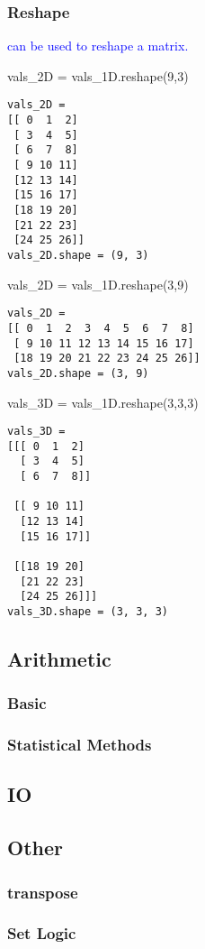 \subsubsection{Reshape}

\textcolor{blue}{ can be used to reshape a matrix.}

\begin{python}
vals_2D = vals_1D.reshape(9,3)
\end{python}
\begin{lstlisting}[style=pyOutStyle]
vals_2D = 
[[ 0  1  2]
 [ 3  4  5]
 [ 6  7  8]
 [ 9 10 11]
 [12 13 14]
 [15 16 17]
 [18 19 20]
 [21 22 23]
 [24 25 26]]
vals_2D.shape = (9, 3)
\end{lstlisting}



\begin{python}
vals_2D = vals_1D.reshape(3,9)
\end{python}
\begin{lstlisting}[style=pyOutStyle]
vals_2D = 
[[ 0  1  2  3  4  5  6  7  8]
 [ 9 10 11 12 13 14 15 16 17]
 [18 19 20 21 22 23 24 25 26]]
vals_2D.shape = (3, 9)
\end{lstlisting}



\begin{python}
vals_3D = vals_1D.reshape(3,3,3)
\end{python}
\begin{lstlisting}[style=pyOutStyle]
vals_3D = 
[[[ 0  1  2]
  [ 3  4  5]
  [ 6  7  8]]

 [[ 9 10 11]
  [12 13 14]
  [15 16 17]]

 [[18 19 20]
  [21 22 23]
  [24 25 26]]]
vals_3D.shape = (3, 3, 3)
\end{lstlisting}


\subsection{Arithmetic}

\subsubsection{Basic}

\subsubsection{Statistical Methods}

\subsection{IO}



\subsection{Other}

\subsubsection{transpose}

\subsubsection{Set Logic}



